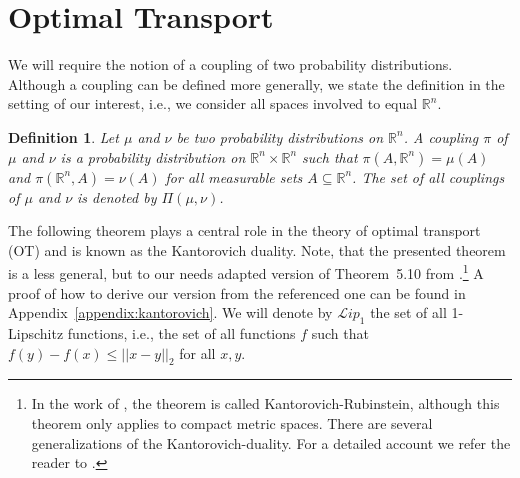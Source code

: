 \documentclass{article} %
\newcommand{\RR}[1][]{\mathbb{R}^{#1}}
\newcommand{\norm}[1]{||{#1}||_2}
\newcommand{\Li}[1]{\mathcal{L}ip_{#1}}
\newtheorem{definition}{Definition}
\begin{document}


\section{Optimal Transport}\label{sec:optimalTransport}

We will require the notion of a coupling of two probability distributions. Although a coupling can be defined more generally, we state the definition in the setting of our interest, i.e., we consider all spaces involved to equal $\RR[n]$.
%
\begin{definition}
Let $\mu$ and $\nu$ be two probability distributions on $\RR[n]$. A coupling $\pi$ of $\mu$ and $\nu$ is a probability distribution on $\RR[n]\times \RR[n]$ such that $\pi(A,\RR[n])=\mu(A)$ and $\pi(\RR[n],A)=\nu(A)$ for all measurable sets $A\subseteq \RR[n]$.
The set of all couplings of $\mu$ and $\nu$ is denoted by $\Pi(\mu,\nu)$.
\end{definition}
%
The following theorem plays a central role in the theory of optimal transport (OT) and is known as the Kantorovich duality.
 Note, that the presented theorem is a less general, but to our needs adapted version of Theorem~5.10 from \citet{optimalTransport}.\footnote{In 
the work of 
\citet{WGAN}, the theorem is called Kantorovich-Rubinstein, although this theorem only applies to compact metric spaces. There are several generalizations of the Kantorovich-duality. For a detailed account we refer the reader to
\citet{Kantorovich_Rubinstein_theorem_Edwards}.} A proof of how to derive our version from the referenced one can be found in Appendix~\ref{appendix:kantorovich}. We will denote by  $\Li{1}$ the set of all 1-Lipschitz functions, i.e., the set of all functions $f$ such that $f(y)-f(x)\leq \norm{x-y}$ for all $x,y$.
\end{document}

